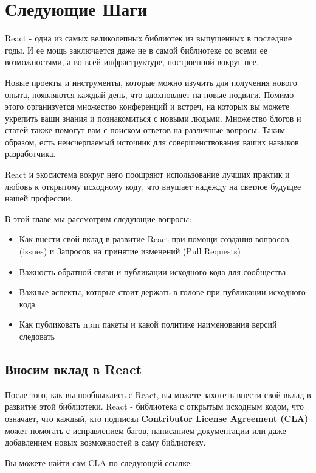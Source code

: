 \chapter{Следующие Шаги}

React - одна из самых великолепных библиотек из выпущенных в последние годы. И ее мощь заключается даже не в самой библиотеке со всеми ее возможностями, а во всей инфраструктуре, построенной вокруг нее.

Новые проекты и инструменты, которые можно изучить для получения нового опыта, появляются каждый день, что вдохновляет на новые подвиги. Помимо этого организуется множество конференций и встреч, на которых вы можете укрепить ваши знания и познакомиться с новыми людьми. Множество блогов и статей также помогут вам с поиском ответов на различные вопросы. Таким образом, есть неисчерпаемый источник для совершенствования ваших навыков разработчика.

React и экосистема вокруг него поощряют использование лучших практик и любовь к открытому исходному коду, что внушает надежду на светлое будущее нашей профессии.

В этой главе мы рассмотрим следующие вопросы:

\begin{itemize}
  \item Как внести свой вклад в развитие React при помощи создания вопросов (issues) и Запросов на принятие изменений (Pull Requests)
  \item Важность обратной связи и публикации исходного кода для сообщества
  \item Важные аспекты, которые стоит держать в голове при публикации исходного кода
  \item Как публиковать npm пакеты и какой политике наименования версий следовать
\end{itemize}


\section{Вносим вклад в React}

После того, как вы пообвыклись с React, вы можете захотеть внести свой вклад в развитие этой библиотеки. React - библиотека с открытым исходным кодом, что означает, что каждый, кто подписал \textbf{Contributor License Agreement (CLA)} может помогать с исправлением багов, написанием документации или даже добавлением новых возможностей в саму библиотеку.

Вы можете найти сам CLA по следующей ссылке:


